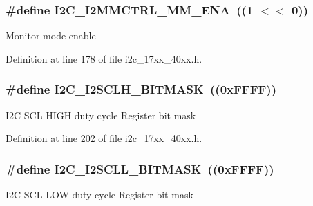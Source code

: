 \subsubsection[{\texorpdfstring{I2\+C\+\_\+\+I2\+M\+M\+C\+T\+R\+L\+\_\+\+M\+M\+\_\+\+E\+NA}{I2C_I2MMCTRL_MM_ENA}}]{\setlength{\rightskip}{0pt plus 5cm}\#define I2\+C\+\_\+\+I2\+M\+M\+C\+T\+R\+L\+\_\+\+M\+M\+\_\+\+E\+NA~((1 $<$$<$ 0))}\hypertarget{group__I2C__17XX__40XX_ga8dc8fa566a5113c3e1b35c0580d90d9f}{}\label{group__I2C__17XX__40XX_ga8dc8fa566a5113c3e1b35c0580d90d9f}
Monitor mode enable 

Definition at line 178 of file i2c\+\_\+17xx\+\_\+40xx.\+h.

\subsubsection[{\texorpdfstring{I2\+C\+\_\+\+I2\+S\+C\+L\+H\+\_\+\+B\+I\+T\+M\+A\+SK}{I2C_I2SCLH_BITMASK}}]{\setlength{\rightskip}{0pt plus 5cm}\#define I2\+C\+\_\+\+I2\+S\+C\+L\+H\+\_\+\+B\+I\+T\+M\+A\+SK~((0x\+F\+F\+F\+F))}\hypertarget{group__I2C__17XX__40XX_gad6a9a202cf4d30607475338f7b59968a}{}\label{group__I2C__17XX__40XX_gad6a9a202cf4d30607475338f7b59968a}
I2C S\+CL H\+I\+GH duty cycle Register bit mask 

Definition at line 202 of file i2c\+\_\+17xx\+\_\+40xx.\+h.

\subsubsection[{\texorpdfstring{I2\+C\+\_\+\+I2\+S\+C\+L\+L\+\_\+\+B\+I\+T\+M\+A\+SK}{I2C_I2SCLL_BITMASK}}]{\setlength{\rightskip}{0pt plus 5cm}\#define I2\+C\+\_\+\+I2\+S\+C\+L\+L\+\_\+\+B\+I\+T\+M\+A\+SK~((0x\+F\+F\+F\+F))}\hypertarget{group__I2C__17XX__40XX_gadf54076e458f10fc00be5ed9504bc930}{}\label{group__I2C__17XX__40XX_gadf54076e458f10fc00be5ed9504bc930}
I2C S\+CL L\+OW duty cycle Register bit mask 

